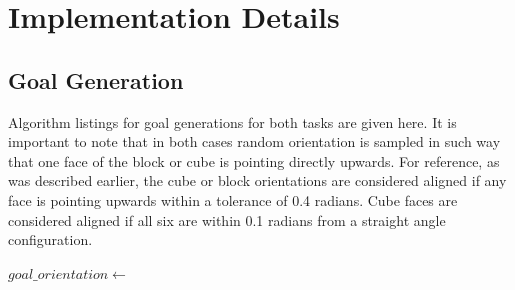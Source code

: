 \FloatBarrier
\section{Implementation Details}
\label{app:hyper}

\subsection{Goal Generation}
\label{app:goal-generation}

Algorithm listings for goal generations for both tasks are given here.
It is important to note that in both cases random orientation is sampled in such way that one face of the block or cube is pointing directly upwards. For reference, as was described earlier, the cube or block orientations are considered aligned if any face is pointing upwards within a tolerance of 0.4 radians. Cube faces are considered aligned if all six are within 0.1 radians from a straight angle configuration.


\begin{algorithm}
\caption{Block reorientation goal generation}
\label{algorithm:block_goal_generation}
\begin{algorithmic}
\State $goal\_orientation \gets$  
\State {} 
\end{algorithmic}
\end{algorithm}



